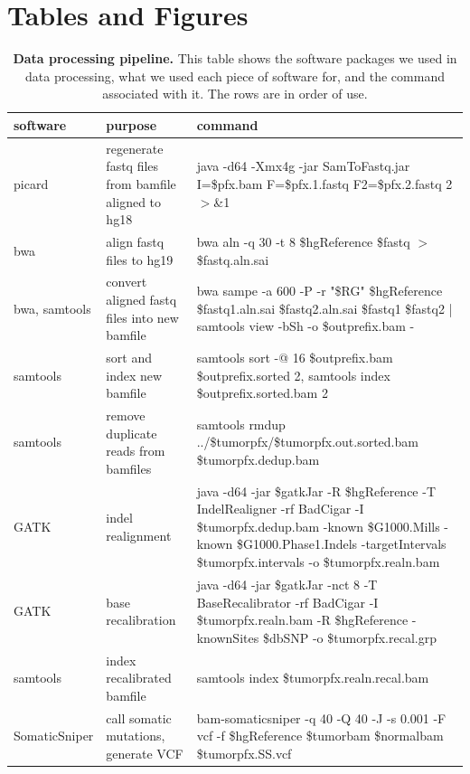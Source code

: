 \documentclass[11pt]{article} %
\begin{document}
\section{Tables and Figures}

\begin{landscape}
\begin{table}
\begin{tabular}{ p{2.5cm} p{4cm} p{14cm} }
	software & purpose & command\\
	\hline
	picard & regenerate fastq files from bamfile aligned to hg18 & java -d64 -Xmx4g -jar SamToFastq.jar I=\$pfx.bam F=\$pfx.1.fastq F2=\$pfx.2.fastq 2$>$\&1 \\
	bwa & align fastq files to hg19 & bwa aln -q 30 -t 8 \$hgReference \$fastq $>$ \$fastq.aln.sai \\
	bwa, samtools & convert aligned fastq files into new bamfile & bwa sampe -a 600 -P -r "\$RG" \$hgReference \$fastq1.aln.sai \$fastq2.aln.sai \$fastq1 \$fastq2 | samtools view -bSh -o \$outprefix.bam - \\
	samtools & sort and index new bamfile & samtools sort -@ 16 \$outprefix.bam \$outprefix.sorted 2, samtools index \$outprefix.sorted.bam 2 \\
	samtools & remove duplicate reads from bamfiles & samtools rmdup ../\$tumorpfx/\$tumorpfx.out.sorted.bam \$tumorpfx.dedup.bam \\
	GATK & indel realignment & java -d64 -jar \$gatkJar -R \$hgReference -T IndelRealigner -rf BadCigar -I \$tumorpfx.dedup.bam -known \$G1000.Mills -known \$G1000.Phase1.Indels -targetIntervals \$tumorpfx.intervals -o \$tumorpfx.realn.bam \\
	GATK & base recalibration & java -d64 -jar \$gatkJar -nct 8 -T BaseRecalibrator -rf BadCigar -I \$tumorpfx.realn.bam -R \$hgReference -knownSites \$dbSNP -o \$tumorpfx.recal.grp \\
	samtools & index recalibrated bamfile & samtools index \$tumorpfx.realn.recal.bam \\
	SomaticSniper & call somatic mutations, generate VCF & bam-somaticsniper -q 40 -Q 40 -J -s 0.001 -F vcf -f \$hgReference \$tumorbam \$normalbam \$tumorpfx.SS.vcf \\
\end{tabular}
\caption{\textbf{Data processing pipeline.} This table shows the software packages we used in data processing, what we used each piece of software for, and the command associated with it. The rows are in order of use.}
\end{table}
\end{landscape}
\end{document}
